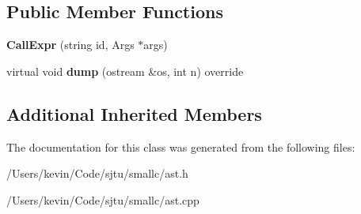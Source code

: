 \subsection*{Public Member Functions}
\begin{DoxyCompactItemize}
\item 
\mbox{\label{class_call_expr_a4717596b2946bec91de14fe27bb66520}} 
{\bfseries Call\+Expr} (string id, Args $\ast$args)
\item 
\mbox{\label{class_call_expr_a1dbe2dd41bb5062c2b93b36869aa3083}} 
virtual void {\bfseries dump} (ostream \&os, int n) override
\end{DoxyCompactItemize}
\subsection*{Additional Inherited Members}


The documentation for this class was generated from the following files\+:\begin{DoxyCompactItemize}
\item 
/\+Users/kevin/\+Code/sjtu/smallc/ast.\+h\item 
/\+Users/kevin/\+Code/sjtu/smallc/ast.\+cpp\end{DoxyCompactItemize}
